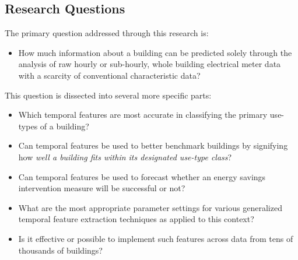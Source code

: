 \subsection{Research Questions}
The primary question addressed through this research is:
\begin{itemize}
\item How much information about a building can be predicted solely through the analysis of raw hourly or sub-hourly, whole building electrical meter data with a scarcity of conventional characteristic data? 
\end{itemize}
This question is dissected into several more specific parts:
\begin{itemize}
\item Which temporal features are most accurate in classifying the primary use-types of a building?
\item Can temporal features be used to better benchmark buildings by signifying how \emph{well a building fits within its designated use-type class}?
\item Can temporal features be used to forecast whether an energy savings intervention measure will be successful or not?
\item What are the most appropriate parameter settings for various generalized temporal feature extraction techniques as applied to this context?
\item Is it effective or possible to implement such features across data from tens of thousands of buildings?
\end{itemize}






